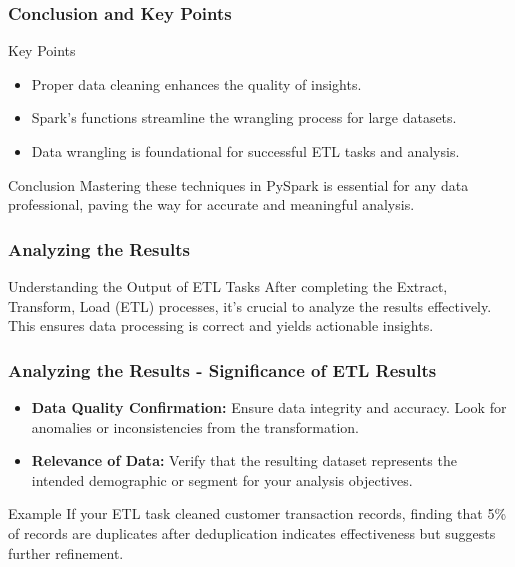\documentclass[aspectratio=169]{beamer}
\begin{document}
\begin{frame}[fragile]
    \frametitle{Conclusion and Key Points}
    \begin{block}{Key Points}
        \begin{itemize}
            \item Proper data cleaning enhances the quality of insights.
            \item Spark's functions streamline the wrangling process for large datasets.
            \item Data wrangling is foundational for successful ETL tasks and analysis.
        \end{itemize}
    \end{block}
    \begin{block}{Conclusion}
        Mastering these techniques in PySpark is essential for any data professional, paving the way for accurate and meaningful analysis.
    \end{block}
\end{frame}

\begin{frame}[fragile]
    \frametitle{Analyzing the Results}
    \begin{block}{Understanding the Output of ETL Tasks}
        After completing the Extract, Transform, Load (ETL) processes, it's crucial to analyze the results effectively. This ensures data processing is correct and yields actionable insights.
    \end{block}
\end{frame}

\begin{frame}[fragile]
    \frametitle{Analyzing the Results - Significance of ETL Results}
    \begin{itemize}
        \item \textbf{Data Quality Confirmation:} Ensure data integrity and accuracy. Look for anomalies or inconsistencies from the transformation.
        \item \textbf{Relevance of Data:} Verify that the resulting dataset represents the intended demographic or segment for your analysis objectives.
    \end{itemize}
    
    \begin{block}{Example}
        If your ETL task cleaned customer transaction records, finding that 5\% of records are duplicates after deduplication indicates effectiveness but suggests further refinement.
    \end{block}
\end{frame}
\end{document}
